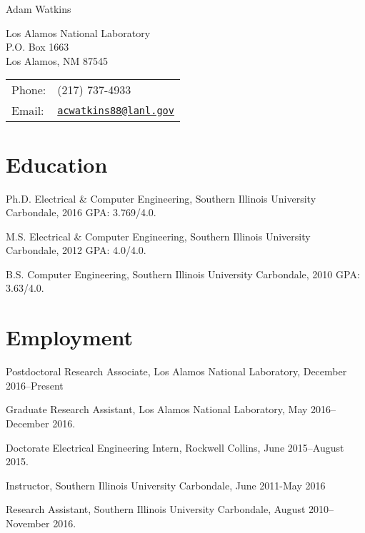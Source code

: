 \documentclass[letterpaper]{article}
\def\name{Adam Watkins}
\renewenvironment{itemize}{
  \begin{list}{}{
    \setlength{\leftmargin}{1.5em}
  }
}{
  \end{list}
}
\begin{document}
{\huge \name}


\vspace{0.25in}

\begin{minipage}{0.45\linewidth}
  Los Alamos National Laboratory \\
  P.O. Box 1663  \\
  Los Alamos, NM 87545
\end{minipage}
\begin{minipage}{0.45\linewidth}
  \begin{tabular}{ll}
    Phone: & (217) 737-4933 \\
    Email: & \href{acwatkins88@lanl.gov}{\tt acwatkins88@lanl.gov} \\
  \end{tabular}
\end{minipage}


\section*{Education}

\begin{itemize}
	
\item Ph.D. Electrical \& Computer Engineering, Southern Illinois University Carbondale, 2016 GPA: 3.769/4.0. 
\item M.S. Electrical \& Computer Engineering, Southern Illinois University Carbondale, 2012 GPA: 4.0/4.0.
\item B.S. Computer Engineering, Southern Illinois University Carbondale, 2010 GPA: 3.63/4.0.

\end{itemize}


\section*{Employment}

\begin{itemize}
\item Postdoctoral Research Associate, Los Alamos National Laboratory, December 2016--Present
\item Graduate Research Assistant, Los Alamos National Laboratory, May 2016--December 2016.
\item Doctorate Electrical Engineering Intern, Rockwell Collins, June 2015--August 2015.
\item Instructor, Southern Illinois University Carbondale, June 2011-May 2016
\item Research Assistant, Southern Illinois University Carbondale, August 2010--November 2016.
\end{itemize}
\end{document}
